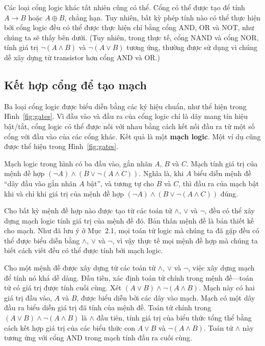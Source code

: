 Các loại cổng logic khác tất nhiên cũng có thể. Cổng có thể được tạo để tính $A \to B$ hoặc $A \oplus B$, chẳng hạn. Tuy nhiên, bất kỳ phép tính nào có thể thực hiện bởi cổng logic đều có thể được thực hiện chỉ bằng cổng AND, OR và NOT, như chúng ta sẽ thấy bên dưới. (Tuy nhiên, trong thực tế, cổng NAND và cổng NOR, tính giá trị $\lnot(A \land B)$ và $\lnot(A \lor B)$ tương ứng, thường được sử dụng vì chúng dễ xây dựng từ transistor hơn cổng AND và OR.)

\subsection{Kết hợp cổng để tạo mạch}

Ba loại cổng logic được biểu diễn bằng các ký hiệu chuẩn, như thể hiện trong Hình~\ref{fig:gates}. Vì đầu vào và đầu ra của cổng logic chỉ là dây mang tín hiệu bật/tắt, cổng logic có thể được nối với nhau bằng cách kết nối đầu ra từ một số cổng với đầu vào của các cổng khác. Kết quả là một \textbf{mạch logic}. Một ví dụ cũng được thể hiện trong Hình~\ref{fig:gates}.

Mạch logic trong hình có ba đầu vào, gắn nhãn $A$, $B$ và $C$. Mạch tính giá trị của mệnh đề hợp $(\lnot A) \land (B \lor \lnot(A \land C))$. Nghĩa là, khi $A$ biểu diễn mệnh đề ``dây đầu vào gắn nhãn $A$ bật'', và tương tự cho $B$ và $C$, thì đầu ra của mạch bật khi và chỉ khi giá trị của mệnh đề hợp $(\lnot A) \land (B \lor \lnot(A \land C))$ đúng.

Cho bất kỳ mệnh đề hợp nào được tạo từ các toán tử $\land$, $\lor$ và $\lnot$, đều có thể xây dựng mạch logic tính giá trị của mệnh đề đó. Bản thân mệnh đề là bản thiết kế cho mạch. Như đã lưu ý ở Mục~2.1, mọi toán tử logic mà chúng ta đã gặp đều có thể được biểu diễn bằng $\land$, $\lor$ và $\lnot$, vì vậy thực tế mọi mệnh đề hợp mà chúng ta biết cách viết đều có thể được tính bởi mạch logic.

Cho một mệnh đề được xây dựng từ các toán tử $\land$, $\lor$ và $\lnot$, việc xây dựng mạch để tính nó khá dễ dàng. Đầu tiên, xác định toán tử chính trong mệnh đề---toán tử có giá trị được tính cuối cùng. Xét $(A \lor B) \land \lnot(A \land B)$. Mạch này có hai giá trị đầu vào, $A$ và $B$, được biểu diễn bởi các dây vào mạch. Mạch có một dây đầu ra biểu diễn giá trị đã tính của mệnh đề. Toán tử chính trong $(A \lor B) \land \lnot(A \land B)$ là $\land$ đầu tiên, tính giá trị của biểu thức tổng thể bằng cách kết hợp giá trị của các biểu thức con $A \lor B$ và $\lnot(A \land B)$. Toán tử $\land$ này tương ứng với cổng AND trong mạch tính đầu ra cuối cùng.


